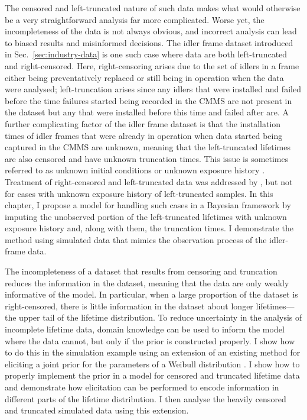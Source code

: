 The censored and left-truncated nature of such data makes what would otherwise be a very straightforward analysis far more complicated. Worse yet, the incompleteness of the data is not always obvious, and incorrect analysis can lead to biased results and misinformed decisions. The idler frame dataset introduced in Sec.~\ref{sec:industry-data} is one such case where data are both left-truncated and right-censored. Here, right-censoring arises due to the set of idlers in a frame either being preventatively replaced or still being in operation when the data were analysed; left-truncation arises since any idlers that were installed and failed before the time failures started being recorded in the CMMS are not present in the dataset but any that were installed before this time and failed after are. A further complicating factor of the idler frame dataset is that the installation times of idler frames that were already in operation when data started being captured in the CMMS are unknown, meaning that the left-truncated lifetimes are also censored and have unknown truncation times. This issue is sometimes referred to as unknown initial conditions or unknown exposure history \citep{guo1993}. Treatment of right-censored and left-truncated data was addressed by \citet{hong2009}, but not for cases with unknown exposure history of left-truncated samples. In this chapter, I propose a model for handling such cases in a Bayesian framework by imputing the unobserved portion of the left-truncated lifetimes with unknown exposure history and, along with them, the truncation times. I demonstrate the method using simulated data that mimics the observation process of the idler-frame data.

The incompleteness of a dataset that results from censoring and truncation reduces the information in the dataset, meaning that the data are only weakly informative of the model. In particular, when a large proportion of the dataset is right-censored, there is little information in the dataset about longer lifetimes---the upper tail of the lifetime distribution. To reduce uncertainty in the analysis of incomplete lifetime data, domain knowledge can be used to inform the model where the data cannot, but only if the prior is constructed properly. I show how to do this in the simulation example using an extension of an existing method for eliciting a joint prior for the parameters of a Weibull distribution \citep{kaminskiy2005}. I show how to properly implement the prior in a model for censored and truncated lifetime data and demonstrate how elicitation can be performed to encode information in different parts of the lifetime distribution. I then analyse the heavily censored and truncated simulated data using this extension.


